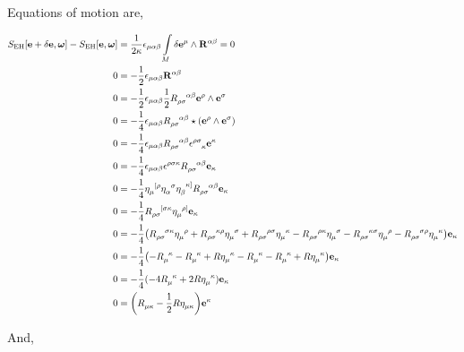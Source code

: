 Equations of motion are,

\begin{align*}
    S_{\textnormal{EH}}\qty[\vb e+\delta\vb e,\boldsymbol\omega]-S_{\textnormal{EH}}\qty[\vb e,\boldsymbol\omega]&=\frac{1}{2\kappa}\epsilon_{\mu\alpha\beta}\int\limits_M\delta\vb e^{\mu}\wedge\vb R^{\alpha\beta}=0\\
    0&=-\frac12\epsilon_{\mu\alpha\beta}\vb R^{\alpha\beta}\\
    0&=-\frac12\epsilon_{\mu\alpha\beta}\frac12\tensor{R}{_\rho_\sigma^\alpha^\beta}\vb e^\rho\wedge\vb e^\sigma\\
    0&=-\frac14\epsilon_{\mu\alpha\beta}\tensor{R}{_\rho_\sigma^\alpha^\beta}\star\qty(\vb e^\rho\wedge\vb e^\sigma)\\
    0&=-\frac14\epsilon_{\mu\alpha\beta}\tensor{R}{_\rho_\sigma^\alpha^\beta}\tensor{\epsilon}{^\rho^\sigma_\kappa}\vb e^\kappa\\
    0&=-\frac14\epsilon_{\mu\alpha\beta}\tensor{\epsilon}{^\rho^\sigma^\kappa}\tensor{R}{_\rho_\sigma^\alpha^\beta}\vb e_\kappa\\
    0&=-\frac14\tensor{\eta}{_\mu^{[\rho}}\tensor{\eta}{_\alpha^{\sigma}}\tensor{\eta}{_\beta^{\kappa]}}\tensor{R}{_\rho_\sigma^\alpha^\beta}\vb e_\kappa\\
    0&=-\frac14\tensor{R}{_\rho_\sigma^{[\sigma}^\kappa}\tensor{\eta}{_\mu^{\rho]}}\vb e_\kappa\\
    0&=-\frac14\qty(\tensor{R}{_\rho_\sigma^{\sigma}^\kappa}\tensor{\eta}{_\mu^{\rho}}+\tensor{R}{_\rho_\sigma^\kappa^\rho}\tensor{\eta}{_\mu^{\sigma}}+\tensor{R}{_\rho_\sigma^\rho^\sigma}\tensor{\eta}{_\mu^\kappa}-\tensor{R}{_\rho_\sigma^{\rho}^\kappa}\tensor{\eta}{_\mu^{\sigma}}-\tensor{R}{_\rho_\sigma^\kappa^\sigma}\tensor{\eta}{_\mu^{\rho}}-\tensor{R}{_\rho_\sigma^\sigma^\rho}\tensor{\eta}{_\mu^\kappa})\vb e_\kappa\\
    0&=-\frac14\qty(-\tensor{R}{_\mu^\kappa}-\tensor{R}{_\mu^\kappa}+R\tensor{\eta}{_\mu^\kappa}-\tensor{R}{_\mu^\kappa}-\tensor{R}{_\mu^\kappa}+R\tensor{\eta}{_\mu^\kappa})\vb e_\kappa\\
    0&=-\frac14(-4\tensor{R}{_\mu^\kappa}+2R\tensor{\eta}{_\mu^\kappa})\vb e_\kappa\\
    0&=\qty(\tensor{R}{_\mu_\kappa}-\frac12R\tensor{\eta}{_\mu_\kappa})\vb e^\kappa
\end{align*}

And,

